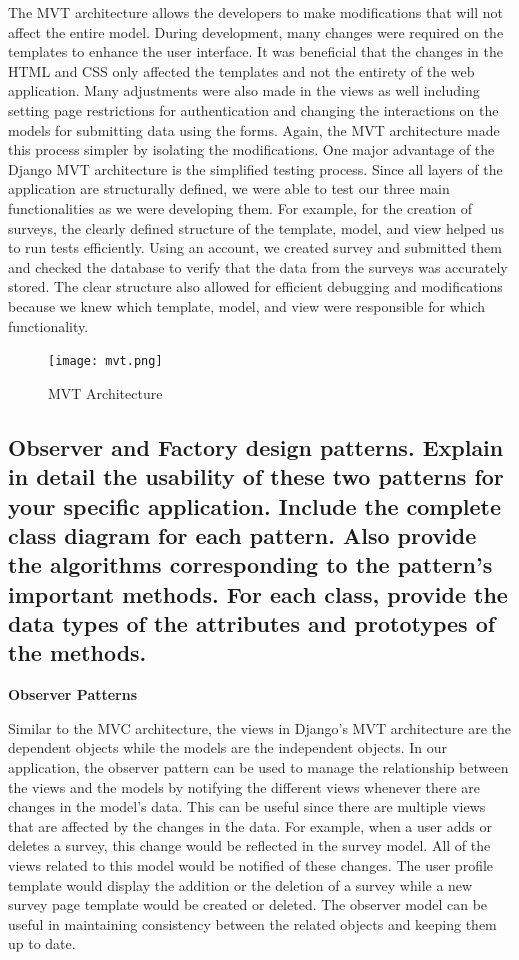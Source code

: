 \documentclass[letterpaper, 12 pt, conference]{ieeeconf}
\begin{document}
The MVT architecture allows the developers to make modifications that will not affect the entire model. During development, many changes were required on the templates to enhance the user interface. It was beneficial that the changes in the HTML and CSS only affected the templates and not the entirety of the web application. Many adjustments were also made in the views as well including setting page restrictions for authentication and changing the interactions on the models for submitting data using the forms. Again, the MVT architecture made this process simpler by isolating the modifications.
\newline
\newpage
One major advantage of the Django MVT architecture is the simplified testing process. Since all layers of the application are structurally defined, we were able to test our three main functionalities as we were developing them. For example, for the creation of surveys, the clearly defined structure of the template, model, and view helped us to run tests efficiently. Using an account, we created survey and submitted them and checked the database to verify that the data from the surveys was accurately stored. The clear structure also allowed for efficient debugging and modifications because we knew which template, model, and view were responsible for which functionality.
\newline


\begin{figure}[h]
        \centering
        \texttt{[image: mvt.png]}
        \caption{MVT Architecture}
    \end{figure}

    \newpage
    
\subsection{Observer and Factory design patterns. Explain in detail the usability of these two patterns for your specific application. Include the complete class diagram for each pattern. Also provide the algorithms corresponding to the pattern’s important methods. For each class, provide the data types of the attributes and prototypes of the methods.}

\textbf{Observer Patterns}

Similar to the MVC architecture, the views in Django’s MVT architecture are the dependent objects while the models are the independent objects. In our application, the observer pattern can be used to manage the relationship between the views and the models by notifying the different views whenever there are changes in the model’s data. This can be useful since there are multiple views that are affected by the changes in the data. For example, when a user adds or deletes a survey, this change would be reflected in the survey model. All of the views related to this model would be notified of these changes. The user profile template would display the addition or the deletion of a survey while a new survey page template would be created or deleted. The observer model can be useful in maintaining consistency between the related objects and keeping them up to date. 
\newline
\clearpage
\end{document}
